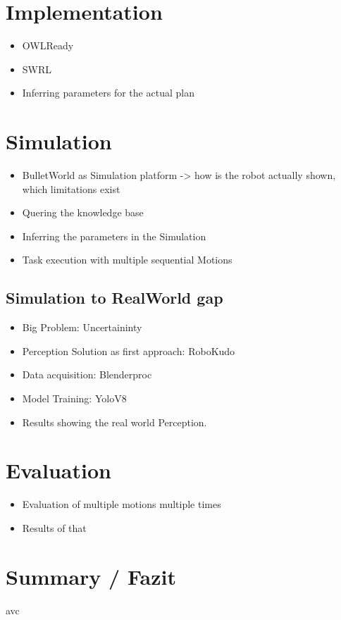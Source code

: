 \documentclass[	pdftex, 
								a4paper,
								11pt, DIV11, BCOR5mm,
								parskip,
								]{scrreprt}
\begin{document}
	\chapter*{Implementation}
	\begin{itemize}
		\item OWLReady
		\item SWRL
		\item Inferring parameters for the actual plan
	\end{itemize}
	\chapter*{Simulation}
	\begin{itemize}
		\item BulletWorld as Simulation platform -> how is the robot actually shown, which limitations exist
		\item Quering the knowledge base
		\item Inferring the parameters in the Simulation
		\item Task execution with multiple sequential Motions
	\end{itemize}
	\section*{Simulation to RealWorld gap}
	\begin{itemize}
		\item Big Problem: Uncertaininty
		\item Perception Solution as first approach: RoboKudo
		\item Data acquisition: Blenderproc
		\item Model Training: YoloV8
		\item Results showing the real world Perception.
	\end{itemize}
	\chapter*{Evaluation}
	\begin{itemize}
		\item Evaluation of multiple motions multiple times
		\item Results of that
	\end{itemize}
	\chapter*{Summary / Fazit}
avc
\end{document}
